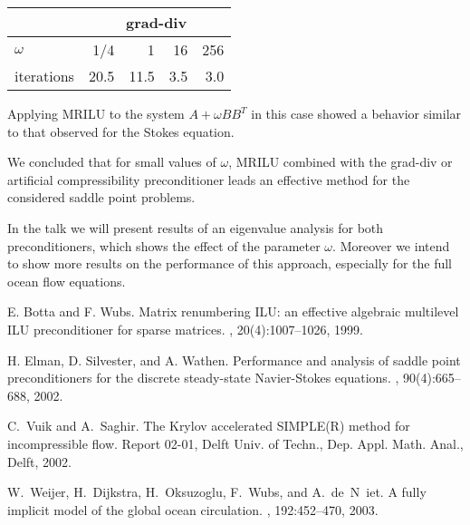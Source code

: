 \documentclass{report}
\begin{document}
\begin{center}
\begin{tabular}{l|rrrr|}
&\multicolumn{4}{|c}{\sc grad-div} \\
\hline
$\omega$ &1/4 &1 & 16 &256\\
iterations &20.5 &11.5 &3.5 &3.0\\
\hline
\end{tabular}
\end{center}
Applying {\sc MRILU} to the system $A+\omega BB^T$ in this case
showed a behavior similar to that observed for the Stokes
equation.

We concluded that for small values of $\omega$, MRILU combined
with the grad-div or artificial compressibility preconditioner
leads an effective method for the considered saddle point
problems.

In the talk we will present results of an eigenvalue analysis for
both preconditioners, which shows the effect of the parameter
$\omega$. Moreover we intend to show more results on the
performance of this approach, especially for the full ocean flow
equations.

\begin{thebibliography}{1}
\small

E. Botta and F. Wubs.
\newblock Matrix renumbering {I}{L}{U}: an effective algebraic multilevel
{I}{L}{U} preconditioner for sparse matrices.
, 20(4):1007--1026,
1999.

H. Elman, D. Silvester, and A. Wathen.
\newblock Performance and analysis of saddle point preconditioners for the
discrete steady-state {N}avier-{S}tokes equations.
, 90(4):665--688, 2002.

C.~Vuik and A.~Saghir.
\newblock The {K}rylov accelerated {SIMPLE(R)} method for incompressible flow.
\newblock Report 02-01, Delft Univ. of Techn., Dep. Appl. Math. Anal., Delft, 2002.

W.~Weijer, H.~Dijkstra, H.~Oksuzoglu, F.~Wubs, and A.~de~N~iet.
\newblock A fully implicit model of the global ocean circulation.
, 192:452--470, 2003.

\end{thebibliography}
\end{document}
